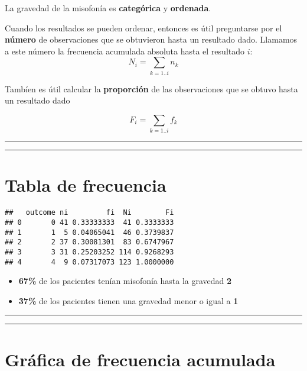\documentclass[
]{book}
\begin{document}
La gravedad de la misofonía es \textbf{categórica} y \textbf{ordenada}.

Cuando los resultados se pueden ordenar, entonces es útil preguntarse por el \textbf{número} de observaciones que se obtuvieron hasta un resultado dado. Llamamos a este número la frecuencia acumulada absoluta hasta el resultado \(i\):
\[N_i=\sum_{k=1..i} n_k\]

Tambíen es útil calcular la \textbf{proporción} de las observaciones que se obtuvo hasta un resultado dado

\[F_i=\sum_{k=1..i} f_k\]

\begin{center}\rule{0.5\linewidth}{0.5pt}\end{center}

\begin{center}\rule{0.5\linewidth}{0.5pt}\end{center}

\hypertarget{tabla-de-frecuencia}{%
\section{Tabla de frecuencia}\label{tabla-de-frecuencia}}

\begin{verbatim}
##   outcome ni         fi  Ni        Fi
## 0       0 41 0.33333333  41 0.3333333
## 1       1  5 0.04065041  46 0.3739837
## 2       2 37 0.30081301  83 0.6747967
## 3       3 31 0.25203252 114 0.9268293
## 4       4  9 0.07317073 123 1.0000000
\end{verbatim}

\begin{itemize}
\item
  \textbf{67\%} de los pacientes tenían misofonía hasta la gravedad \textbf{2}
\item
  \textbf{37\%} de los pacientes tienen una gravedad menor o igual a \textbf{1}
\end{itemize}

\begin{center}\rule{0.5\linewidth}{0.5pt}\end{center}

\begin{center}\rule{0.5\linewidth}{0.5pt}\end{center}

\hypertarget{gruxe1fica-de-frecuencia-acumulada}{%
\section{Gráfica de frecuencia acumulada}\label{gruxe1fica-de-frecuencia-acumulada}}
\end{document}

